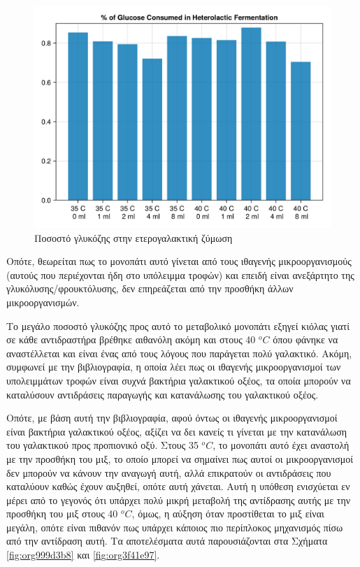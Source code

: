 \documentclass[11pt]{report}
\begin{document}
\begin{figure}[htbp]
\centering
\includegraphics[width=.9\linewidth]{../plots/metabolic_results/heterolactate_flux.png}
\caption{\label{fig:org919988f}Ποσοστό γλυκόζης στην ετερογαλακτική ζύμωση}
\end{figure}

Οπότε, θεωρείται πως το μονοπάτι αυτό γίνεται από τους ιθαγενής μικροοργανισμούς (αυτούς που περιέχονται ήδη στο υπόλειμμα τροφών) και επειδή είναι ανεξάρτητο της γλυκόλυσης/φρουκτόλυσης, δεν επηρεάζεται από την προσθήκη άλλων μικροοργανισμών.

Το μεγάλο ποσοστό γλυκόζης προς αυτό το μεταβολικό μονοπάτι εξηγεί κιόλας γιατί σε κάθε αντιδραστήρα βρέθηκε αιθανόλη ακόμη και στους 40 \(^oC\) όπου φάνηκε να αναστέλλεται και είναι ένας από τους λόγους που παράγεται πολύ γαλακτικό. Ακόμη, συμφωνεί με την βιβλιογραφία, η οποία λέει πως οι ιθαγενής μικροοργανισμοί των υπολειμμάτων τροφών είναι συχνά βακτήρια γαλακτικού οξέος, τα οποία μπορούν να καταλύσουν αντιδράσεις παραγωγής και κατανάλωσης του γαλακτικού οξέος.

Οπότε, με βάση αυτή την βιβλιογραφία, αφού όντως οι ιθαγενής μικροοργανισμοί είναι βακτήρια γαλακτικού οξέος, αξίζει να δει κανείς τι γίνεται με την κατανάλωση του γαλακτικού προς προπιονικό οξύ. Στους 35 \(^oC\), το μονοπάτι αυτό έχει αναστολή με την προσθήκη του μιξ, το οποίο μπορεί να σημαίνει πως αυτοί οι μικροοργανισμοί δεν μπορούν να κάνουν την αναγωγή αυτή, αλλά επικρατούν οι αντιδράσεις που καταλύουν καθώς έχουν αυξηθεί, οπότε αυτή χάνεται. Αυτή η υπόθεση ενισχύεται εν μέρει από το γεγονός ότι υπάρχει πολύ μικρή μεταβολή της αντίδρασης αυτής με την προσθήκη του μιξ στους 40 \(^oC\), όμως, η αύξηση όταν προστίθεται το μιξ είναι μεγάλη, οπότε είναι πιθανόν πως υπάρχει κάποιος πιο περίπλοκος μηχανισμός πίσω από την αντίδραση αυτή. Τα αποτελέσματα αυτά παρουσιάζονται στα Σχήματα \ref{fig:org999d3b8} και \ref{fig:org3f41e97}. 
\end{document}
